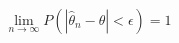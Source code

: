 \documentclass[preview]{standalone}
\begin{document}
\begin{align*}
\lim_{n \to \infty} P(|\hat{\theta}_n - \theta| < \epsilon) = 1
\end{align*}
\end{document}
